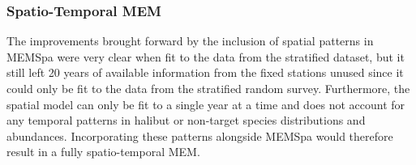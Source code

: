 \documentclass[12pt]{article}\usepackage[]{graphicx}\usepackage[]{color}
\begin{document}
\hypertarget{spatio-temporal-mem}{%
\subsubsection{Spatio-Temporal MEM}\label{spatio-temporal-mem}}

The improvements brought forward by the inclusion of spatial patterns in MEMSpa were very clear when fit to the data from the stratified dataset, but it still left 20 years of available information from the fixed stations unused since it could only be fit to the data from the stratified random survey. Furthermore, the spatial model can only be fit to a single year at a time and does not account for any temporal patterns in halibut or non-target species distributions and abundances. Incorporating these patterns alongside MEMSpa would therefore result in a fully spatio-temporal MEM.
\end{document}
